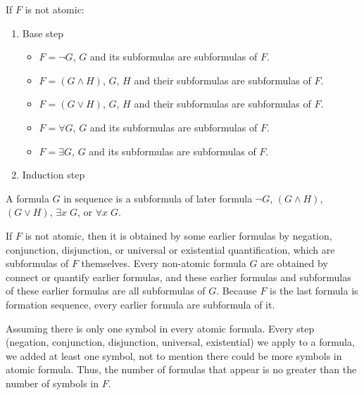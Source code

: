 \documentclass{ctexart}
\begin{document}
If $F$ is not atomic:
\begin{enumerate}
	\item Base step
	\begin{itemize}
		\item $F = \lnot G$, $G$ and its subformulas are subformulas of $F$.
		\item $F = (G \land H)$, $G$, $H$ and their subformulas are subformulas of $F$.
		\item $F = (G \lor H)$, $G$, $H$ and their subformulas are subformulas of $F$.
		\item $F = \forall G$, $G$ and its subformulas are subformulas of $F$.
		\item $F = \exists G$, $G$ and its subformulas are subformulas of $F$.
	\end{itemize}
	
	\item Induction step
\end{enumerate}


A formula $G$ in sequence is a subformula of later formula $\lnot G$, $(G \land H)$, $(G \lor H)$,
$\exists x\; G$, or $\forall x\; G$.

If $F$ is not atomic, then it is obtained by some earlier formulas by
negation, conjunction, disjunction, or universal or existential quantification,
which are subformulas of $F$ themselves.  
Every non-atomic formula $G$ are obtained by connect or quantify earlier
formulas, and these earlier formulas and subformulas of these earlier formulas
are all subformulas of $G$. Because $F$ is the last formula is formation
sequence, every earlier formula are subformula of it.

Assuming there is only one symbol in every atomic formula. Every step (negation,
conjunction, disjunction, universal, existential) we apply to a formula, we
added at least one symbol, not to mention there could be more symbols in atomic
formula. Thus, the number of formulas that appear is no greater than
the number of symbols in $F$.
\end{document}
